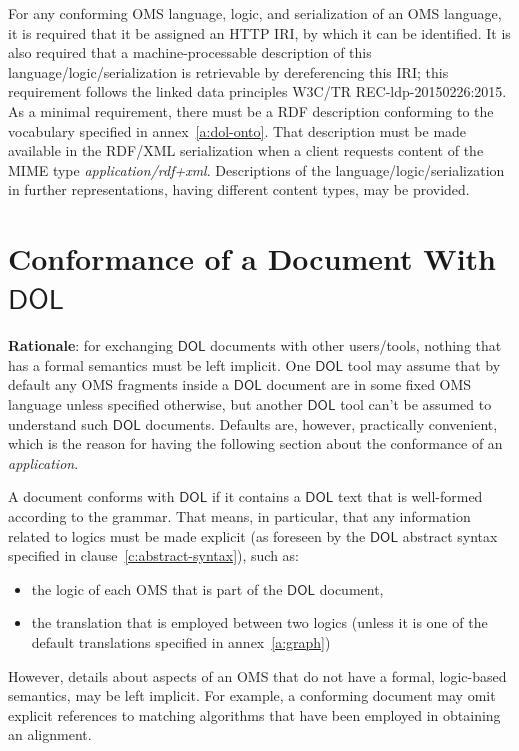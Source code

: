 \documentclass[10pt,fleqn,final]{scrreprt}
\makeatletter
\newcommand{\cbs}[0]{\color{red}\xspace} %
\newcommand{\cbe}[0]{\color{black}\xspace} %
\newcommand*{\eg}{e.g.\@\xspace}
\newcommand*\CommentAuthor{}
\renewcommand*\CommentAuthor{#1}}
\newcommand*\CommentDate{}
\renewcommand*\CommentDate{#1}}
\newcommand*\CommentId{}
\renewcommand*\CommentId{#1}}
\newcommand*\CommentType{}
\renewcommand*\CommentType{#1}}
\newcommand*{\SetCommentColorByType}[1]{%
\edef\localType{{#1}}%
\expandafter\ifstrequal\localType{q-aut}{\colorlet{CommentColor}{red}}{%
\expandafter\ifstrequal\localType{q-all}{\colorlet{CommentColor}{orange}}{%
\expandafter\ifstrequal\localType{todo}{\colorlet{CommentColor}{orange}}{%
\expandafter\ifstrequal\localType{fyi}{\colorlet{CommentColor}{lightgray}}{%
\colorlet{CommentColor}{yellow}}}}}}
\newcommand*{\SetCommentPrefixByType}[1]{%
\edef\localType{{#1}}%
\expandafter\@ifmtarg\localType{%
\edef\CommentPrefix{}%
}{%
\caseupper[q]{#1}%
\edef\CommentPrefix{\thestring: }%
}}
\newcommand*{\initComment}[1]{%
\setkeys{Comment}{#1}%
\SetCommentColorByType{\CommentType}%
\relax%
\SetCommentPrefixByType{\CommentType}%
\relax%
}
\newcommand*{\todonote}[2][]{%
\initComment{#1}%
\pdfcomment[author=\CommentAuthor,color=CommentColor,date=\CommentDate,id=\CommentId]{%
\CommentPrefix
#2}}
\renewcommand*{\todonote}[2][]{%
\initComment{#1}%
\ednote{\CommentPrefix #2}}
\newcommand*{\CLnote}[2][author=Christoph Lange]{%
\todonote[author=Christoph Lange,#1]{#2} 
}
\newcommand*{\mimetype}[1]{\textit{#1}}
\newcommand*{\DOL}{\ensuremath{\mathsf{DOL}}\xspace}
\newcommand{\annexrefname}{annex}
\newcommand{\clauserefname}{clause}
\newcommand{\aref}[1]{\annexrefname~\ref{#1}}
\newcommand{\cref}[1]{\clauserefname~\ref{#1}}
\newcommand{\sclause}[1]{\section{#1}}
\newcommand{\nisref}[1]{#1}
\makeatother
\begin{document}
For any conforming OMS language, logic, and serialization of an OMS language, it is required that it be assigned an HTTP IRI, by which it can be identified.  It is also required that a machine-processable description of this language/logic/serialization\cbs is\cbe retrievable by dereferencing this IRI;\cbs this requirement follows\cbe the linked data principles \nisref{W3C/TR REC-ldp-20150226:2015}. 
\cbs As a minimal requirement, there must be a RDF description conforming to the vocabulary specified in \aref{a:dol-onto}. That description\cbs must\cbe be made available in the RDF/XML serialization\cbe when a client requests content of the MIME type \mimetype{application/rdf+xml}.  Descriptions of the language/logic/serialization in further representations, having different content types, may be provided.%


\sclause{Conformance of a Document With \DOL}\label{c:conform:document}
\begin{fminipage}{\textwidth}
\textbf{Rationale}: for exchanging \DOL documents with other users/tools, nothing that has a formal semantics
must be left implicit.  One \DOL tool may assume that by default any OMS fragments inside a \DOL
document are in some fixed OMS language unless specified otherwise, but another \DOL tool can't be
assumed to understand such \DOL documents.  Defaults are, however, practically convenient, which is
the reason for having the following section about the conformance of an \emph{application}.
\end{fminipage}

A document conforms with \DOL if it contains a \DOL text that is well-formed according to the
grammar.  That means, in particular, that any information related to logics\cbs must\cbe be made explicit
(as foreseen by the \DOL abstract syntax specified in \cref{c:abstract-syntax}), such as:
\begin{itemize}
\item the logic of each OMS that is part of the \DOL document,
\item the translation that is employed between two logics (unless it is one of the default translations specified in \aref{a:graph})
\end{itemize}
However, details about aspects of an OMS that do not have a formal, logic-based semantics, may be
left implicit.  For example, a conforming document may omit explicit references to matching
algorithms that have been employed in obtaining an alignment.
\end{document}
